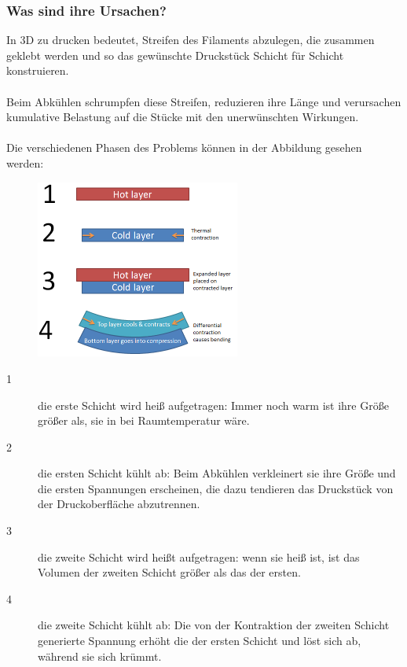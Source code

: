 \documentclass[11pt,a4paper]{article}
\begin{document}
		\subsubsection{Was sind ihre Ursachen?}In 3D zu drucken bedeutet, Streifen des Filaments abzulegen, die zusammen geklebt werden und so das gewünschte Druckstück Schicht für Schicht konstruieren.
\\\\
Beim Abkühlen schrumpfen diese Streifen, reduzieren ihre Länge und verursachen kumulative Belastung auf die Stücke mit den unerwünschten Wirkungen.
\\\\
Die verschiedenen Phasen des Problems können in der Abbildung gesehen werden:
\begin{figure}[H]
\centering
\includegraphics[width=0.6\textwidth,cfbox=azul_marcos 4pt 0pt]{FOTOS/CAUSA_WARPING_1}
\end{figure}

\begin{description}
\item[1] die erste Schicht wird heiß aufgetragen: Immer noch warm ist ihre Größe größer als, sie in bei Raumtemperatur wäre. 
\item[2] die ersten Schicht kühlt ab: Beim Abkühlen verkleinert sie ihre Größe und die ersten Spannungen erscheinen, die dazu tendieren das Druckstück von der Druckoberfläche abzutrennen. 
\item[3] die zweite Schicht wird heißt aufgetragen: wenn sie heiß ist, ist das Volumen der zweiten Schicht größer als das der ersten. 
\item[4] die zweite Schicht kühlt ab: Die von der Kontraktion der zweiten Schicht generierte Spannung erhöht die der ersten Schicht und löst sich ab, während sie sich krümmt. 

\end{description}
\end{document}
